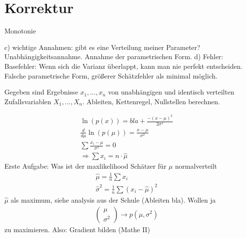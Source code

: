 \setcounter{chapter}{3}
\chapter{Korrektur}

\begin{aufgabe}
\end{aufgabe}

Monotonie

c) wichtige Annahmen: gibt es eine Verteilung meiner Parameter? Unabhängigkeitsannahme. Annahme der parametrischen Form.
d) Fehler: Basefehler: Wenn sich die Varianz überlappt, kann man nie perfekt entscheiden. Falsche parametrische Form, größerer Schätzfehler als minimal möglich.

\begin{aufgabe}
\end{aufgabe}

Gegeben sind Ergebnisse $x_1,...,x_n$ von unabhängigen und identisch verteilten Zufallsvariablen $X_1,...,X_n$. 
Ableiten, Kettenregel, Nullstellen berechnen.

\begin{align*}
\ln(p(x))=
bla+\frac{-(x-\mu)^2}{2\sigma^2}\\
\frac{d}{d\mu} \ln(p(\mu)) = \frac{x-\mu}{\sigma^2}\\
\sum \frac{x_i - \mu}{\sigma^2} = 0\\
\Rightarrow \sum x_i = n\cdot \hat{\mu}
\end{align*}
Erste Aufgabe: Was ist der maxlikelihood Schätzer für $\mu$ normalverteilt
\begin{align*}
\hat{\mu} = \frac{1}{n} \sum x_i\\
\hat{\sigma}^2 = \frac{1}{n} \sum (x_i - \hat{\mu})^2
\end{align*}
$\hat{\mu}$ als maximum, siehe analysis aus der Schule (Ableiten bla). Wollen ja
\begin{align*}
\begin{pmatrix}\mu \\
\sigma ^2
\end{pmatrix} \to p(\mu,\sigma^2)
\end{align*}
zu maximieren. Also: Gradient bilden (Mathe II)